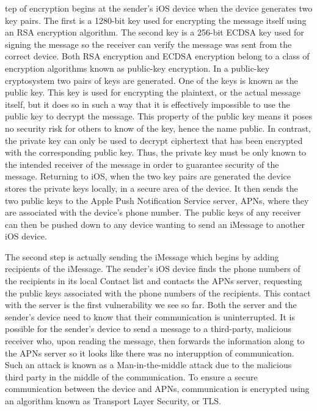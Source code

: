 tep of encryption begins at the sender's iOS device when the device generates two key pairs.  The first is a 1280-bit key used for encrypting the message itself using an RSA encryption algorithm.  The second key is a 256-bit ECDSA key used for signing the message so the receiver can verify the message was sent from the correct device.  Both RSA encryption and ECDSA encryption belong to a class of encryption algorithms known as public-key encryption. In a public-key cryptosystem two pairs of keys are generated.  One of the keys is known as the public key.  This key is used for encrypting the plaintext, or the actual message itself, but it does so in such a way that it is effectively impossible to use the public key to decrypt the message.  This property of the public key means it poses no security risk for others to know of the key, hence the name public.  In contrast, the private key can only be used to decrypt ciphertext that has been encrypted with the corresponding public key.  Thus, the private key must be only known to the intended receiver of the message in order to guarantee security of the message.  Returning to iOS, when the two key pairs are generated the device stores the private keys locally, in a secure area of the device.  It then sends the two public keys to the Apple Push Notification Service server, APNs, where they are associated with the device's phone number.  The public keys of any receiver can then be pushed down to any device wanting to send an iMessage to another iOS device.


The second step is actually sending the iMessage which begins by adding recipients of the iMessage.  The sender's iOS device finds the phone numbers of the recipients in its local Contact list and contacts the APNs server, requesting the public keys associated with the phone numbers of the recipients.  This contact with the server is the first vulnerability we see so far.  Both the server and the sender's device need to know that their communication is uninterrupted.  It is possible for the sender's device to send a message to a third-party, malicious receiver who, upon reading the message, then forwards the information along to the APNs server so it looks like there was no interupption of communication.  Such an attack is known as a Man-in-the-middle attack due to the malicious third party in the middle of the communication.  To ensure a secure communication between the device and APNs, communication is encrypted using an algorithm known as Transport Layer Security, or TLS.

